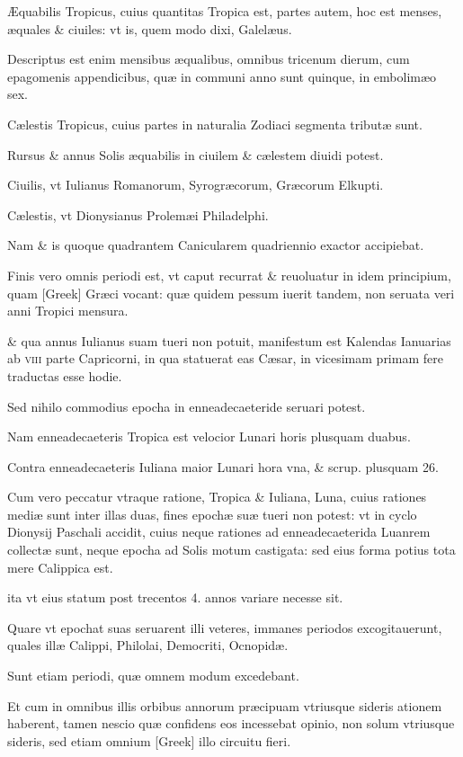 \begin{parnumbers}

Æquabilis
Tropicus, cuius quantitas
Tropica est, partes autem, hoc est menses, æquales \& ciuiles: vt is,
quem modo dixi, Galelæus.

Descriptus est enim mensibus æqualibus,
omnibus tricenum dierum, cum epagomenis appendicibus, quæ
in communi anno sunt quinque, in embolimæo sex.

Cælestis Tropicus,
cuius partes in naturalia Zodiaci segmenta tributæ sunt.

Rursus
\& annus Solis æquabilis in ciuilem \& cælestem diuidi potest.

Ciuilis,
vt Iulianus Romanorum, Syrogræcorum, Græcorum Elkupti.

Cælestis,
vt Dionysianus Prolemæi Philadelphi.

Nam \& is quoque quadrantem
Canicularem quadriennio exactor accipiebat.

Finis vero
omnis periodi est, vt caput recurrat \& reuoluatur in idem principium,
quam \textgreek{[Greek]} Græci vocant: quæ quidem pessum iuerit tandem,
non seruata veri anni Tropici mensura.

\& qua annus Iulianus 
suam tueri non potuit, manifestum est Kalendas Ianuarias ab \textsc{viii}
parte Capricorni, in qua statuerat eas Cæsar, in vicesimam primam
fere traductas esse hodie.

Sed nihilo commodius epocha in enneadecaeteride
seruari potest.

Nam enneadecaeteris Tropica est velocior
Lunari horis plusquam duabus.

Contra enneadecaeteris Iuliana
maior Lunari hora vna, \& scrup. plusquam 26.

Cum vero peccatur
vtraque ratione, Tropica \& Iuliana, Luna, cuius rationes mediæ sunt
inter illas duas, fines epochæ suæ tueri non potest: vt in cyclo Dionysij
Paschali accidit, cuius neque rationes ad enneadecaeterida Luanrem
collectæ sunt, neque epocha ad Solis motum castigata: sed eius
forma potius tota mere Calippica est.

ita vt eius statum post trecentos
4. annos variare necesse sit.

Quare vt epochat suas seruarent illi veteres,
immanes periodos excogitauerunt, quales illæ Calippi, Philolai, Democriti,
Ocnopidæ.

Sunt etiam periodi, quæ omnem modum excedebant.

Et cum in omnibus illis orbibus annorum præcipuam
vtriusque sideris ationem haberent, tamen nescio quæ confidens eos
incessebat opinio, non solum vtriusque sideris, sed etiam omnium
\textgreek{[Greek]} illo circuitu fieri.


\end{parnumbers}
